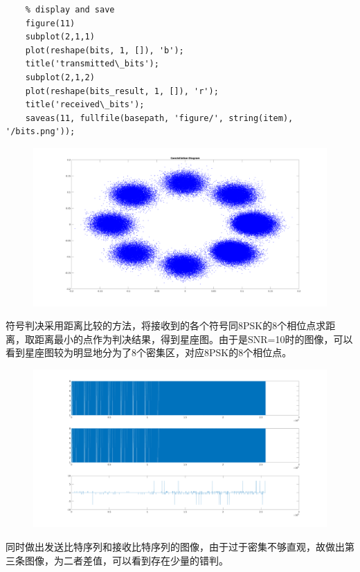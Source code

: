 \begin{spacing}{1.5}
\begin{lstlisting}
    % display and save
    figure(11)
    subplot(2,1,1)
    plot(reshape(bits, 1, []), 'b');
    title('transmitted\_bits');
    subplot(2,1,2)
    plot(reshape(bits_result, 1, []), 'r');
    title('received\_bits');
    saveas(11, fullfile(basepath, 'figure/', string(item), '/bits.png'));
\end{lstlisting}

\begin{figure}[H]
\centering
\includegraphics[width = \columnwidth]{constellation.png}
\end{figure}


符号判决采用距离比较的方法，将接收到的各个符号同8PSK的8个相位点求距离，取距离最小的点作为判决结果，得到星座图。由于是SNR=10时的图像，可以看到星座图较为明显地分为了8个密集区，对应8PSK的8个相位点。


\begin{figure}[H]
\centering
\includegraphics[width = \columnwidth]{error.png}
\end{figure}

同时做出发送比特序列和接收比特序列的图像，由于过于密集不够直观，故做出第三条图像，为二者差值，可以看到存在少量的错判。


\end{spacing}

